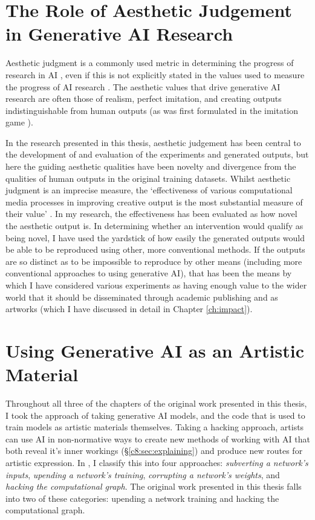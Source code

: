 \section{The Role of Aesthetic Judgement in Generative AI Research}
\label{c8:sec:aesthetic}

Aesthetic judgment is a commonly used metric in determining the progress of research in AI \citep{stanley2018art}, even if this is not explicitly stated in the values used to measure the progress of AI research \citep{birhane2022values}.
The aesthetic values that drive generative AI research are often those of realism, perfect imitation, and creating outputs indistinguishable from human outputs (as was first formulated in the imitation game \citep{machinery1950computing}). 

In the research presented in this thesis, aesthetic judgement has been central to the development of and evaluation of the experiments and generated outputs, but here the guiding aesthetic qualities have been novelty and divergence from the qualities of human outputs in the original training datasets.
Whilst aesthetic judgment is an imprecise measure, the `effectiveness of various computational media processes in improving creative output is the most substantial measure of their value' \citep{brown2009integrating}. 
In my research, the effectiveness has been evaluated as how novel the aesthetic output is. 
In determining whether an intervention would qualify as being novel, I have used the yardstick of how easily the generated outputs would be able to be reproduced using other, more conventional methods.
If the outputs are so distinct as to be impossible to reproduce by other means (including more conventional approaches to using generative AI), that has been the means by which I have considered various experiments as having enough value to the wider world that it should be disseminated through academic publishing and as artworks (which I have discussed in detail in Chapter \ref{ch:impact}).

\section{Using Generative AI as an Artistic Material}
\label{c8:sec:material}
Throughout all three of the chapters of the original work presented in this thesis, I took the approach of taking generative AI models, and the code that is used to train models as artistic materials themselves.
Taking a hacking approach, artists can use AI in non-normative ways to create new methods of working with AI that both reveal it's inner workings (\S \ref{c8:sec:explaining}) and produce new routes for artistic expression. 
In \cite{broad2024using}, I classify this into four approaches: \textit{subverting a network's inputs}, \textit{upending a network's training}, \textit{corrupting a network's weights}, and \textit{hacking the computational graph}. 
The original work presented in this thesis falls into two of these categories: upending a network training and hacking the computational graph.

